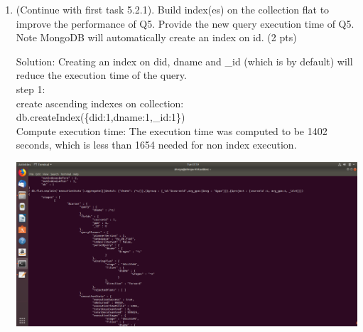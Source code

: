 \documentclass[10pt]{article}
\begin{document}
\begin{enumerate}
\begin{itemize}
			\item Write a new MongoDB query Q6 on the new collection nested which satisfies the same
			requirement in 5.2.1(b) as Q5. Provide the query execution time of Q6. (2 pts)
				$
				\\db.flat.explain('executionStats').aggregate([
				\\\{\$match: 
				    \\\{"dname":
				    /\string^c/\}\},\{\$unwind : "\$student.gpa"\},\{\$group : \\\{\_id:"\$course.courseid",avg\_gpa:
				    \\\{\$avg : "\$student.gpa"\}\}\},
				    \\\{\$project : \{\_id:1, avg\_gpa:1, \}
				\\\}])
				$
				The query execution time is less than a millisecond as it fetches only one document from the collection.

		\end{itemize}
       \item  (Continue with first task 5.2.1). Build index(es) on the collection flat to improve the performance
       of Q5. Provide the new query execution time of Q5. Note MongoDB will automatically
       create an index on id. (2 pts)
       
       Solution:
       Creating an index on did, dname and \_id (which is by default) will reduce the execution time of the query.
       \\step 1:
       \\create ascending indexes on collection:
       \\db.createIndex(\{did:1,dname:1,\_id:1\})
       \\ Compute execution time:
       The execution time was computed to be 1402 seconds, which is less than 1654 needed for non index execution.
       
       \includegraphics[scale=0.30]{mongo_4.png}
       
       
		\end{enumerate}
		
\end{document}
